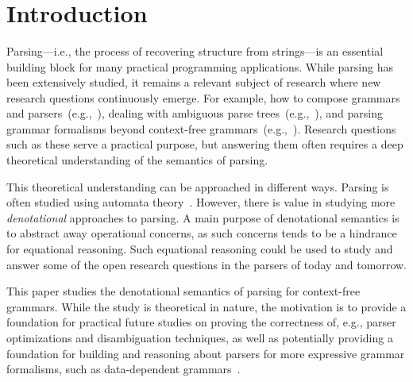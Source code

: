 \begin{code}[hide]%
\>[0]\AgdaSpace{}%
\AgdaSpace{}%
\<%
\\
%
\\[\AgdaEmptyExtraSkip]%
\>[0]\AgdaSpace{}%
\AgdaSpace{}%
\<%
\\
\>[0]\<%
\end{code}

\section{Introduction}

Parsing---i.e., the process of recovering structure from strings---is an essential building block for many practical programming applications.
While parsing has been extensively studied, it remains a relevant subject of research where new research questions continuously emerge.
For example, how to compose grammars and parsers~(e.g.,~\cite{SchwerdfegerW09}), dealing with ambiguous parse trees~(e.g.,~\cite{BrabrandGM10,basten-thesis,one-parser-to-rule-them-all}), and parsing grammar formalisms beyond context-free grammars~(e.g.,~\cite{one-parser-to-rule-them-all}).
Research questions such as these serve a practical purpose, but answering them often requires a deep theoretical understanding of the semantics of parsing.

This theoretical understanding can be approached in different ways.
Parsing is often studied using automata theory~\cite{hopcroft-book}.
However, there is value in studying more \emph{denotational} approaches to parsing.
A main purpose of denotational semantics is to abstract away operational concerns, as such concerns tends to be a hindrance for equational reasoning.
Such equational reasoning could be used to study and answer some of the open research questions in the parsers of today and tomorrow.

This paper studies the denotational semantics of parsing for context-free grammars.
While the study is theoretical in nature, the motivation is to provide a foundation for practical future studies on proving the correctness of, e.g., parser optimizations and disambiguation techniques, as well as potentially providing a foundation for building and reasoning about parsers for more expressive grammar formalisms, such as data-dependent grammars~\cite{one-parser-to-rule-them-all}.

